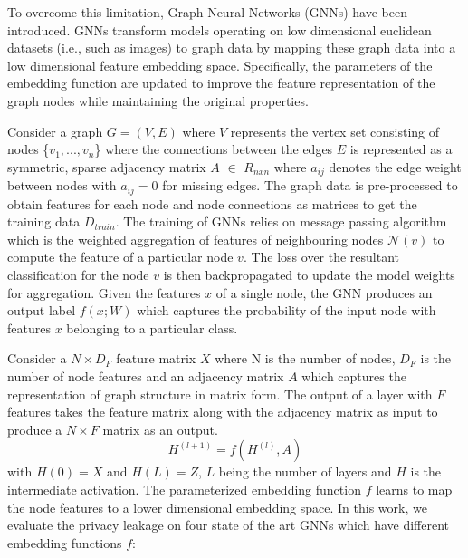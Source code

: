 To overcome this limitation, Graph Neural Networks (GNNs) have been introduced.
GNNs transform models operating on low dimensional euclidean datasets (i.e., such as images) to graph data by mapping these graph data into a low dimensional feature embedding space.
Specifically, the parameters of the embedding function are updated to improve the feature representation of the graph nodes while maintaining the original properties.

Consider a graph $G=(V,E)$ where $V$ represents the vertex set consisting of nodes \{$v_1,...,v_n$\} where the connections between the edges $E$ is represented as a symmetric, sparse adjacency matrix $A$ $\in$ $R_{nxn}$ where $a_{ij}$ denotes the edge weight between nodes with $a_{ij}= 0$ for missing edges.
The graph data is pre-processed to obtain features for each node and node connections as matrices to get the training data $D_{train}$.
The training of GNNs relies on message passing algorithm which is the weighted aggregation of features of neighbouring nodes $\mathcal{N}(v)$ to compute the feature of a particular node $v$.
The loss over the resultant classification for the node $v$ is then backpropagated to update the model weights for aggregation.
Given the features $x$ of a single node, the GNN produces an output label $f(x;W)$ which captures the probability of the input node with features $x$ belonging to a particular class.

Consider a $N\times D_F$ feature matrix $X$ where N is the number of nodes, $D_F$ is the number of node features and an adjacency matrix $A$ which captures the representation of graph structure in matrix form.
The output of a layer with $F$ features takes the feature matrix along with the adjacency matrix as input to produce a $N\times F$ matrix as an output.
\begin{equation}
H^{(l+1)} = f(H^{(l)}, A)
\end{equation}
with $H(0)=X$ and $H(L)=Z$, $L$ being the number of layers and $H$ is the intermediate activation.
The parameterized embedding function $f$ learns to map the node features to a lower dimensional embedding space.
In this work, we evaluate the privacy leakage on four state of the art GNNs which have different embedding functions $f$:

